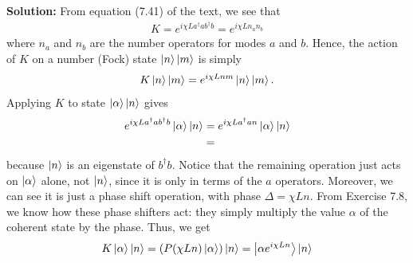 \documentclass{book}
\begin{document}
    \textbf{Solution:} From equation (7.41) of the text, we see that 
    \begin{align}
        K = e^{i\chi L a^\dagger a b^\dagger b} = e^{i\chi L n_a n_b}
    \end{align}
    where $n_a$ and $n_b$ are the number operators for modes $a$ and $b$. Hence, the action of $K$ on a number (Fock) state $\ket{n}\ket{m}$ is simply
    \begin{align}
        K \ket{n}\ket{m} = e^{i\chi L n m} \ket{n}\ket{m}.
    \end{align}
    Applying $K$ to state $\ket{\alpha}\ket{n}$ gives
    \begin{align}
    \begin{aligned}
        e^{i\chi L a^\dagger a b^\dagger b} \ket{\alpha}\ket{n} &= e^{i\chi L a^\dagger a n} \ket{\alpha}\ket{n} \\
        &= 
    \end{aligned}
    \end{align}
    because $\ket{n}$ is an eigenstate of $b^\dagger b$. Notice that the remaining operation just acts on $\ket{\alpha}$ alone, not $\ket{n}$, since it is only in terms of the $a$ operators. Moreover, we can see it is just a phase shift operation, with phase $\Delta = \chi L n$. From Exercise 7.8, we know how these phase shifters act: they simply multiply the value $\alpha$ of the coherent state by the phase. Thus, we get
    \begin{align}
        K \ket{\alpha}\ket{n} = (P(\chi L n) \ket{\alpha}) \ket{n} = \ket{\alpha e^{i\chi L n}} \ket{n}
    \end{align}
\end{document}
